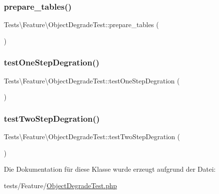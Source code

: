 \subsubsection{\texorpdfstring{prepare\+\_\+tables()}{prepare\_tables()}}
{\footnotesize\ttfamily Tests\textbackslash{}\+Feature\textbackslash{}\+Object\+Degrade\+Test\+::prepare\+\_\+tables (\begin{DoxyParamCaption}{ }\end{DoxyParamCaption})}

\mbox{\label{classTests_1_1Feature_1_1ObjectDegradeTest_ad22ca8b13554ba451bda167e49a04da8}} 
\subsubsection{\texorpdfstring{test\+One\+Step\+Degration()}{testOneStepDegration()}}
{\footnotesize\ttfamily Tests\textbackslash{}\+Feature\textbackslash{}\+Object\+Degrade\+Test\+::test\+One\+Step\+Degration (\begin{DoxyParamCaption}{ }\end{DoxyParamCaption})}

\mbox{\label{classTests_1_1Feature_1_1ObjectDegradeTest_a2d448486857c85c2afcde9fdfc5f9d0f}} 
\subsubsection{\texorpdfstring{test\+Two\+Step\+Degration()}{testTwoStepDegration()}}
{\footnotesize\ttfamily Tests\textbackslash{}\+Feature\textbackslash{}\+Object\+Degrade\+Test\+::test\+Two\+Step\+Degration (\begin{DoxyParamCaption}{ }\end{DoxyParamCaption})}



Die Dokumentation für diese Klasse wurde erzeugt aufgrund der Datei\+:\begin{DoxyCompactItemize}
\item 
tests/\+Feature/\hyperlink{ObjectDegradeTest_8php}{Object\+Degrade\+Test.\+php}\end{DoxyCompactItemize}

